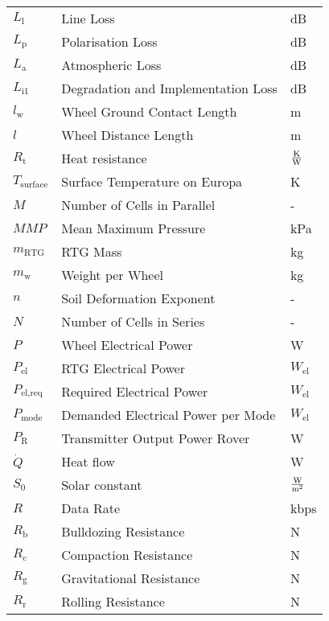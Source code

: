 \begin{longtable}[l]{lll}
${L}_\text{l}$ 				& 	Line Loss									& dB							\\
${L}_\text{p}$ 				&	Polarisation Loss							& dB							\\
${L}_\text{a}$ 				&	Atmospheric Loss								& dB							\\
${L}_\text{i1}$ 				&	Degradation and Implementation Loss			& dB							\\
\(l_\text{w}\)			&	Wheel Ground Contact Length					& m								\\
\(l\)					&	Wheel Distance Length						& m								\\
$R_\text{t}$					&	Heat resistance								& $\frac{{\rm K}}{{\rm W}}$				\\
\(T_\text{surface}\)	&	Surface Temperature on Europa				&	K							\\
$M$						&	Number of Cells in Parallel					& -								\\
\(MMP\)					& 	Mean Maximum Pressure 						& kPa							\\
$m_\text{RTG}$			&	RTG Mass									& kg							\\
\(m_\text{w}\)			&	Weight per Wheel							& kg							\\
\(n\)					&	Soil Deformation Exponent					& -								\\
$N$						&	Number of Cells in Series					& -								\\
\(P\)					&	Wheel Electrical  Power						& W								\\
$P_\text{el}$			&	RTG Electrical Power						& $W_\text{el}$					\\
$P_\text{el,req}$		&	Required Electrical Power					& $W_\text{el}$					\\
$P_\text{mode}$			&	Demanded Electrical Power per Mode			& $W_\text{el}$					\\
${P}_\text{R}$				&	Transmitter Output Power Rover 				& W								\\
$\dot{Q}$				&	Heat flow									& W								\\
	$S_0$				&	Solar constant 							& $\frac{{\rm W}}{{\rm m}^2}$				\\
${R}$ 					&	Data Rate									& kbps							\\
\(R_\text{b}\)			&	Bulldozing Resistance						& N								\\
\(R_\text{c}\)			&	Compaction Resistance						& N								\\
\(R_\text{g}\)			&	Gravitational Resistance					& N								\\
\(R_\text{r}\)			&	Rolling Resistance							& N								\\

\end{longtable}
